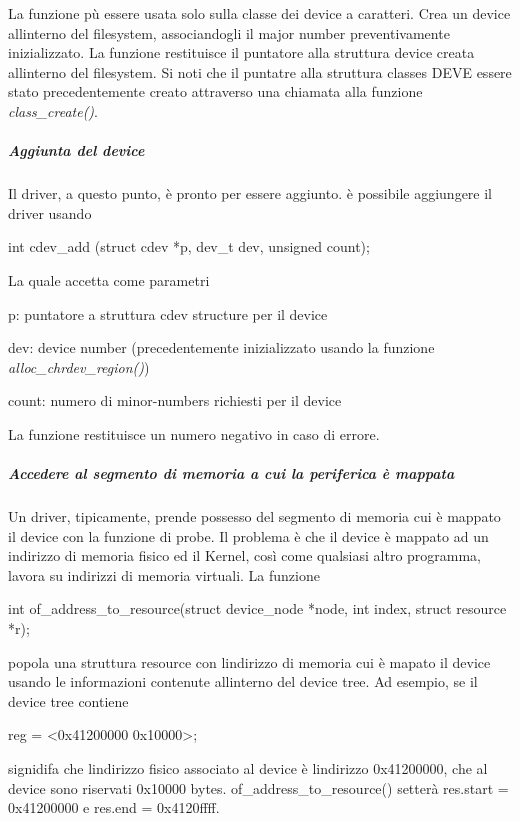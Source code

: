 La funzione pù essere usata solo sulla classe dei device a caratteri. Crea un device all\textquotesingle{}interno del filesystem, associandogli il major number preventivamente inizializzato. La funzione restituisce il puntatore alla struttura device creata all\textquotesingle{}interno del filesystem. Si noti che il puntatre alla struttura classes D\+E\+VE essere stato precedentemente creato attraverso una chiamata alla funzione {\itshape class\+\_\+create()}.

\subparagraph*{Aggiunta del device}

Il driver, a questo punto, è pronto per essere aggiunto. è possibile aggiungere il driver usando 
\begin{DoxyCode}
\textcolor{keywordtype}{int} cdev\_add (\textcolor{keyword}{struct} cdev *p, dev\_t dev, \textcolor{keywordtype}{unsigned} count);
\end{DoxyCode}
 La quale accetta come parametri
\begin{DoxyItemize}
\item p\+: puntatore a struttura cdev structure per il device
\item dev\+: device number (precedentemente inizializzato usando la funzione {\itshape alloc\+\_\+chrdev\+\_\+region()})
\item count\+: numero di minor-\/numbers richiesti per il device
\end{DoxyItemize}

La funzione restituisce un numero negativo in caso di errore.

\subparagraph*{Accedere al segmento di memoria a cui la periferica è mappata}

Un driver, tipicamente, prende possesso del segmento di memoria cui è mappato il device con la funzione di probe. Il problema è che il device è mappato ad un indirizzo di memoria fisico ed il Kernel, così come qualsiasi altro programma, lavora su indirizzi di memoria virtuali. La funzione


\begin{DoxyCode}
\textcolor{keywordtype}{int} of\_address\_to\_resource(\textcolor{keyword}{struct} device\_node *node, \textcolor{keywordtype}{int} index, \textcolor{keyword}{struct} resource *r);
\end{DoxyCode}


popola una struttura resource con l\textquotesingle{}indirizzo di memoria cui è mapato il device usando le informazioni contenute all\textquotesingle{}interno del device tree. Ad esempio, se il device tree contiene 
\begin{DoxyCode}
reg = <0x41200000 0x10000>;
\end{DoxyCode}
 signidifa che l\textquotesingle{}indirizzo fisico associato al device è l\textquotesingle{}indirizzo 0x41200000, che al device sono riservati 0x10000 bytes. of\+\_\+address\+\_\+to\+\_\+resource() setterà res.\+start = 0x41200000 e res.\+end = 0x4120ffff.

